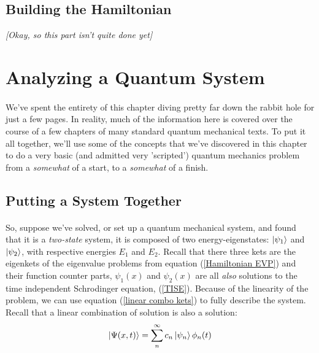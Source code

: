 \documentclass[12pt,letterpaper]{book}
\begin{document}

\subsection*{Building the Hamiltonian}
\textit{[Okay, so this part isn't quite done yet]}


\section{Analyzing a Quantum System}
\paragraph*{}We've spent the entirety of this chapter diving pretty far down the rabbit hole for just a few pages. In reality, much of the information here is covered over the course of a few chapters of many standard quantum mechanical texts. To put it all together, we'll use some of the concepts that we've discovered in this chapter to do a very basic (and admitted very 'scripted') quantum mechanics problem from a \textit{somewhat} of a start, to a \textit{somewhat} of a finish. 


\subsection*{Putting a System Together}
\paragraph*{}So, suppose we've solved, or set up a quantum mechanical system, and found that it is a \textit{two-state} system, it is composed of two energy-eigenstates: 
$\ket{\psi_1}$ and $\ket{\psi_2}$, with respective energies $E_1$ and $E_2$.  Recall that there three kets are the eigenkets of the eigenvalue problems from equation (\ref{Hamiltonian EVP}) and their function counter parts, $\psi_1(x)$ and $\psi_2(x)$ are all \textit{also} solutions to the time independent Schrodinger equation, (\ref{TISE}). Because of the linearity of the problem, we can use equation (\ref{linear combo kets}) to fully describe the system. Recall that a linear combination of solution is also a solution:
\begin{equation}
\ket{\Psi(x,t)} = \sum_n^{\infty} c_n \ket{\psi_n} \phi_n(t)
\end{equation}
\end{document}
